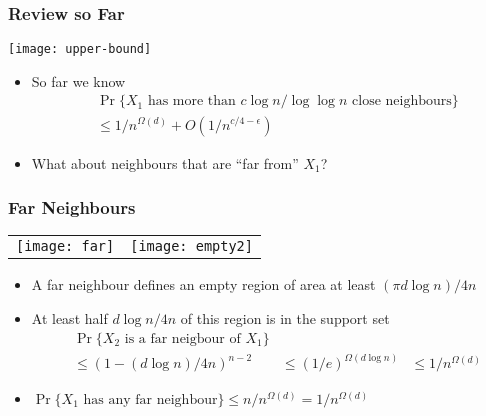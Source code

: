 \documentclass{beamer}
\begin{document}
\frame
{
  \frametitle{Review so Far}

  \begin{center}
    \texttt{[image: upper-bound]}
  \end{center}
   \begin{itemize}
     \item So far we know
       \[
         \begin{aligned}
          &\Pr\{\mbox{$X_1$ has more than $c\log n/\log\log n$ close neighbours}\} \\
          & \le 1/n^{\Omega(d)} + O(1/n^{c/4-\epsilon}) 
         \end{aligned}
       \]
     \item What about neighbours that are ``far from'' $X_1$?
   \end{itemize}
}


\frame
{
  \frametitle{Far Neighbours}

  \begin{center}
    \begin{tabular}{cc}
      \texttt{[image: far]} &
	\texttt{[image: empty2]}
    \end{tabular}
  \end{center}
   \begin{itemize}
     \item A far neighbour defines an empty region of area at least
           $(\pi d\log n)/4n$
     \item At least half $d\log n/4n$ of this region is in the support set
       \[
         \begin{aligned}
          &\Pr\{\mbox{$X_2$ is a far neigbour of $X_1$}\} \\
          & \le (1-(d\log n)/4n)^{n-2}
          & \le (1/e)^{\Omega(d\log n)}
          & \le 1/n^{\Omega(d)}
         \end{aligned}
       \]
      \item 
       $\Pr\{\mbox{$X_1$ has any far neighbour}\} 
           \le n/n^{\Omega(d)} 
           = 1/n^{\Omega(d)}$
   \end{itemize}
}
\end{document}
